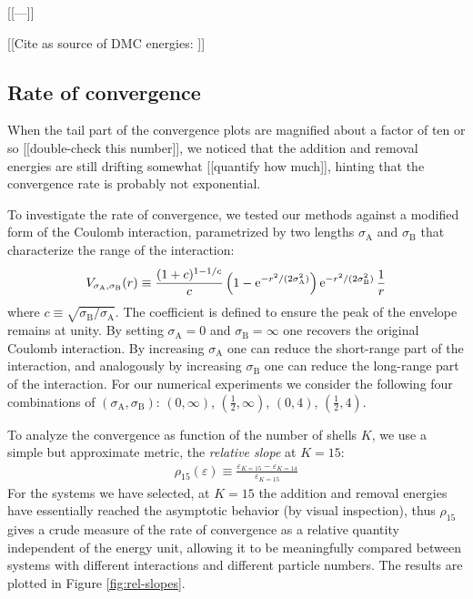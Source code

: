 [[---]]

[[Cite as source of DMC energies: \cite{PhysRevB.84.115302}]]

\subsection{Rate of convergence}

When the tail part of the convergence plots are magnified about a factor of ten or so [[double-check this number]], we noticed that the addition and removal energies are still drifting somewhat [[quantify how much]], hinting that the convergence rate is probably not exponential.

To investigate the rate of convergence, we tested our methods against a modified form of the Coulomb interaction, parametrized by two lengths $\sigma_{\mathrm{A}}$ and $\sigma_{\mathrm{B}}$ that characterize the range of the interaction:
\begin{align}
  V_{\sigma_{\mathrm{A}}, \sigma_{\mathrm{B}}}(r) \equiv \frac{(1 + c)^{1 - 1/c}}{c} \left(1 - \operatorname{e}^{-r^2 / (2 \sigma_{\mathrm{A}}^2)}\right) \operatorname{e}^{-r^2 / (2 \sigma_{\mathrm{B}}^2)} \frac{1}{r}
\end{align}
where $c \equiv \sqrt{\sigma_{\mathrm{B}} / \sigma_{\mathrm{A}}}$.  The coefficient is defined to ensure the peak of the envelope remains at unity.  By setting $\sigma_{\mathrm{A}} = 0$ and $\sigma_{\mathrm{B}} = \infty$ one recovers the original Coulomb interaction.  By increasing $\sigma_{\mathrm{A}}$ one can reduce the short-range part of the interaction, and analogously by increasing $\sigma_{\mathrm{B}}$ one can reduce the long-range part of the interaction.  For our numerical experiments we consider the following four combinations of $(\sigma_{\mathrm{A}}, \sigma_{\mathrm{B}})$: $(0, \infty)$, $(\frac{1}{2}, \infty)$, $(0, 4)$, $(\frac{1}{2}, 4)$.

To analyze the convergence as function of the number of shells $K$, we use a simple but approximate metric, the \textit{relative slope} at $K = 15$:
\begin{align*}
  \rho_{15}(\varepsilon) \equiv \frac{\varepsilon_{K = 15} - \varepsilon_{K = 14}}{\varepsilon_{K = 15}}
\end{align*}
For the systems we have selected, at $K = 15$ the addition and removal energies have essentially reached the asymptotic behavior (by visual inspection), thus $\rho_{15}$ gives a crude measure of the rate of convergence as a relative quantity independent of the energy unit, allowing it to be meaningfully compared between systems with different interactions and different particle numbers.  The results are plotted in Figure \ref{fig:rel-slopes}.

